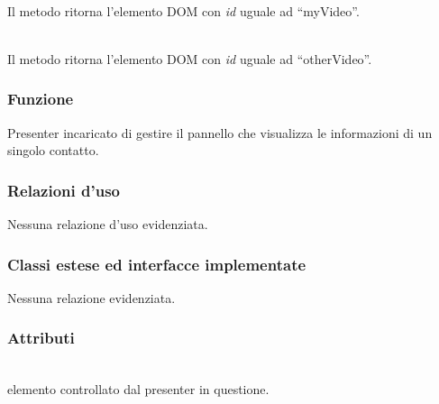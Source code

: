 \begin{description}
\item{}\\
Il metodo ritorna l'elemento DOM con \textit{id} uguale ad ``myVideo''.

\item{}\\
Il metodo ritorna l'elemento DOM con \textit{id} uguale ad ``otherVideo''.

\end{description}


\subsubsection*{Funzione}
Presenter incaricato di gestire il pannello che visualizza le informazioni di un singolo contatto.

\subsubsection*{Relazioni d'uso}
Nessuna relazione d'uso evidenziata.

\subsubsection*{Classi estese ed interfacce implementate}

Nessuna relazione evidenziata.

\subsubsection*{Attributi}
\begin{description}
\item{}\\
  elemento controllato dal presenter in questione.
\end{description}

